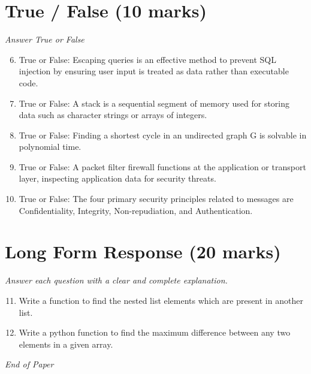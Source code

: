 \documentclass[12pt]{article}
\begin{document}
\section*{True / False (10 marks)}
\textit{Answer True or False}
\begin{enumerate}[label=\arabic*.]
\setcounter{enumi}{5}
\item True or False: Escaping queries is an effective method to prevent SQL injection by ensuring user input is treated as data rather than executable code.
\item True or False: A stack is a sequential segment of memory used for storing data such as character strings or arrays of integers.
\item True or False: Finding a shortest cycle in an undirected graph G is solvable in polynomial time.
\item True or False: A packet filter firewall functions at the application or transport layer, inspecting application data for security threats.
\item True or False: The four primary security principles related to messages are Confidentiality, Integrity, Non-repudiation, and Authentication.
\end{enumerate}

\section*{Long Form Response (20 marks)}
\textit{Answer each question with a clear and complete explanation.}
\begin{enumerate}[label=\arabic*.]
\setcounter{enumi}{10}
\item Write a function to find the nested list elements which are present in another list.
\item Write a python function to find the maximum difference between any two elements in a given array.
\end{enumerate}

\vfill
\noindent\textit{End of Paper}
\end{document}

